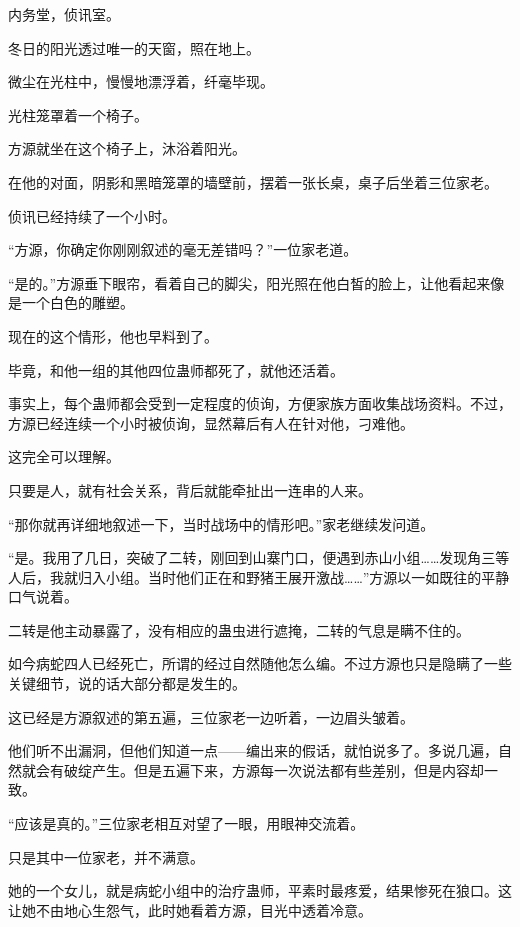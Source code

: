 
\begin{this_body}

内务堂，侦讯室。

冬日的阳光透过唯一的天窗，照在地上。

微尘在光柱中，慢慢地漂浮着，纤毫毕现。

光柱笼罩着一个椅子。

方源就坐在这个椅子上，沐浴着阳光。

在他的对面，阴影和黑暗笼罩的墙壁前，摆着一张长桌，桌子后坐着三位家老。

侦讯已经持续了一个小时。

“方源，你确定你刚刚叙述的毫无差错吗？”一位家老道。

“是的。”方源垂下眼帘，看着自己的脚尖，阳光照在他白皙的脸上，让他看起来像是一个白色的雕塑。

现在的这个情形，他也早料到了。

毕竟，和他一组的其他四位蛊师都死了，就他还活着。

事实上，每个蛊师都会受到一定程度的侦询，方便家族方面收集战场资料。不过，方源已经连续一个小时被侦询，显然幕后有人在针对他，刁难他。

这完全可以理解。

只要是人，就有社会关系，背后就能牵扯出一连串的人来。

“那你就再详细地叙述一下，当时战场中的情形吧。”家老继续发问道。

“是。我用了几日，突破了二转，刚回到山寨门口，便遇到赤山小组……发现角三等人后，我就归入小组。当时他们正在和野猪王展开激战……”方源以一如既往的平静口气说着。

二转是他主动暴露了，没有相应的蛊虫进行遮掩，二转的气息是瞒不住的。

如今病蛇四人已经死亡，所谓的经过自然随他怎么编。不过方源也只是隐瞒了一些关键细节，说的话大部分都是发生的。

这已经是方源叙述的第五遍，三位家老一边听着，一边眉头皱着。

他们听不出漏洞，但他们知道一点——编出来的假话，就怕说多了。多说几遍，自然就会有破绽产生。但是五遍下来，方源每一次说法都有些差别，但是内容却一致。

“应该是真的。”三位家老相互对望了一眼，用眼神交流着。

只是其中一位家老，并不满意。

她的一个女儿，就是病蛇小组中的治疗蛊师，平素时最疼爱，结果惨死在狼口。这让她不由地心生怨气，此时她看着方源，目光中透着冷意。


\end{this_body}

